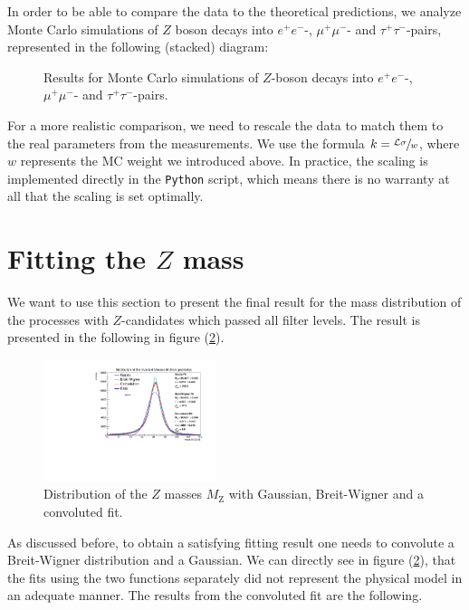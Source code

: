 \documentclass[twocolumn,
			   showpacs,%
               nofootinbib,
               aps,%
               prd,
               notitlepage,
               showkeys,
               10pt]{revtex4-1}
\begin{document}
In order to be able to compare the data to the theoretical predictions, we analyze Monte Carlo simulations of $Z$ boson decays into $e^+e^-$-, $\mu^+\mu^-$- and $\tau^+\tau^-$-pairs, represented in the following (stacked) diagram: %

\begin{figure}[H]
	\centering
	\caption{Results for Monte Carlo simulations of $Z$-boson decays into $e^+e^-$-, $\mu^+\mu^-$- and $\tau^+\tau^-$-pairs.}
	\label{fig:MChisto}
\end{figure}

For a more realistic comparison, we need to rescale the data to match them to the real parameters from the measurements. We use the formula $k = \sfrac{\mathcal{L}\sigma}{w}$, where $w$ represents the MC weight we introduced above. In practice, the scaling is implemented directly in the \verb|Python| script, which means there is no warranty at all that the scaling is set optimally. \\

\blindtext
\section{Fitting the $Z$ mass}

We want to use this section to present the final result for the mass distribution of the processes with $Z$-candidates which passed all filter levels. The result is presented in the following in figure (\ref{fig:MassDist}).

\begin{figure}[H]
	\centering
	\includegraphics[width = 0.45\textwidth]{figures/plots/ZMassFitted}
	\caption{Distribution of the $Z$ masses $M_{\mathrm{Z}}$ with Gaussian, Breit-Wigner and a convoluted fit.}
	\label{fig:MassDist}
\end{figure}

As discussed before, to obtain a satisfying fitting result one needs to convolute a Breit-Wigner distribution and a Gaussian. We can directly see in figure (\ref{fig:MassDist}), that the fits using the two functions separately did not represent the physical model in an adequate manner.
The results from the convoluted fit are the following. \\
\end{document}
